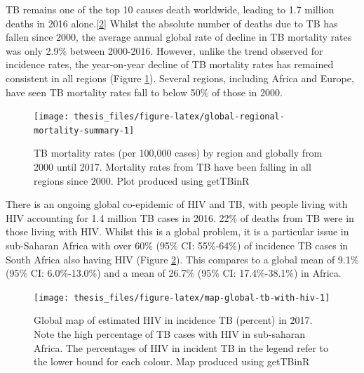 \documentclass[11pt,twoside]{bristolthesis}
\begin{document}
  TB remains one of the top 10 causes death worldwide, leading to 1.7 million deaths in 2016 alone.{[}\protect\hyperlink{ref-TheWorldHealthOrganization:2018va}{2}{]} Whilst the absolute number of deaths due to TB has fallen since 2000, the average annual global rate of decline in TB mortality rates was only 2.9\% between 2000-2016. However, unlike the trend observed for incidence rates, the year-on-year decline of TB mortality rates has remained consistent in all regions (Figure \ref{fig:global-regional-mortality-summary}). Several regions, including Africa and Europe, have seen TB mortality rates fall to below 50\% of those in 2000.
  \begin{figure}
  
  {\centering \texttt{[image: thesis\_files/figure-latex/global-regional-mortality-summary-1]} 
  
  }
  
  \caption[TB mortality rates (per 100,000 cases) by region and globally from 2000 until 2017.]{TB mortality rates (per 100,000 cases) by region and globally from 2000 until 2017. Mortality rates from TB have been falling in all regions since 2000. Plot produced using getTBinR}\label{fig:global-regional-mortality-summary}
  \end{figure}
  There is an ongoing global co-epidemic of HIV and TB, with people living with HIV accounting for 1.4 million TB cases in 2016. 22\% of deaths from TB were in those living with HIV. Whilst this is a global problem, it is a particular issue in sub-Saharan Africa with over 60\% (95\% CI: 55\%-64\%) of incidence TB cases in South Africa also having HIV (Figure \ref{fig:map-global-tb-with-hiv}). This compares to a global mean of 9.1\% (95\% CI: 6.0\%-13.0\%) and a mean of 26.7\% (95\% CI: 17.4\%-38.1\%) in Africa.
  \begin{figure}
  
  {\centering \texttt{[image: thesis\_files/figure-latex/map-global-tb-with-hiv-1]} 
  
  }
  
  \caption[Global map of estimated HIV in incidence TB (percent) in 2017.]{Global map of estimated HIV in incidence TB (percent) in 2017. Note the high percentage of TB cases with HIV in sub-saharan Africa. The percentages of HIV in incident TB in the legend refer to the lower bound for each colour. Map produced using getTBinR}\label{fig:map-global-tb-with-hiv}
  \end{figure}
\end{document}
